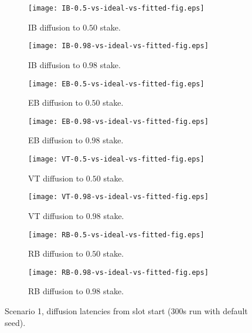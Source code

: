 \documentclass[11pt,a4paper]{article}
\begin{document}
\begin{figure}[htbp]
    \centering
    \begin{subfigure}[b]{0.45\textwidth}
        \centering
        \texttt{[image: IB-0.5-vs-ideal-vs-fitted-fig.eps]}
        \caption{IB diffusion to $0.50$ stake.}
        \label{scenario1:ib0.5}
    \end{subfigure}
    \hfill
    \begin{subfigure}[b]{0.45\textwidth}
        \centering
        \texttt{[image: IB-0.98-vs-ideal-vs-fitted-fig.eps]}
        \caption{IB diffusion to $0.98$ stake.}
        \label{scenario1:ib0.98}
    \end{subfigure}
    
    \vspace{1em}
    
    \begin{subfigure}[b]{0.45\textwidth}
        \centering
        \texttt{[image: EB-0.5-vs-ideal-vs-fitted-fig.eps]}
        \caption{EB diffusion to $0.50$ stake.}
        \label{scenario1:eb0.5}
    \end{subfigure}
    \hfill
    \begin{subfigure}[b]{0.45\textwidth}
        \centering
        \texttt{[image: EB-0.98-vs-ideal-vs-fitted-fig.eps]}
        \caption{EB diffusion to $0.98$ stake.}
        \label{scenario1:eb0.98}
    \end{subfigure}
    
    \vspace{1em}
    
    \begin{subfigure}[b]{0.45\textwidth}
        \centering
        \texttt{[image: VT-0.5-vs-ideal-vs-fitted-fig.eps]}
        \caption{VT diffusion to $0.50$ stake.}
        \label{scenario1:vt0.5}
    \end{subfigure}
    \hfill
    \begin{subfigure}[b]{0.45\textwidth}
        \centering
        \texttt{[image: VT-0.98-vs-ideal-vs-fitted-fig.eps]}
        \caption{VT diffusion to $0.98$ stake.}
        \label{scenario1:vt0.98}
    \end{subfigure}
    
    \vspace{1em}
    
    \begin{subfigure}[b]{0.45\textwidth}
        \centering
        \texttt{[image: RB-0.5-vs-ideal-vs-fitted-fig.eps]}
        \caption{RB diffusion to $0.50$ stake.}
        \label{scenario1:rb0.5}
    \end{subfigure}
    \hfill
    \begin{subfigure}[b]{0.45\textwidth}
        \centering
        \texttt{[image: RB-0.98-vs-ideal-vs-fitted-fig.eps]}
        \caption{RB diffusion to $0.98$ stake.}
        \label{scenario1:rb0.98}
    \end{subfigure}

    \caption{Scenario 1, diffusion latencies from slot start (300s run with default seed).}
    \label{fig:scenario1}
\end{figure}



\end{document}
